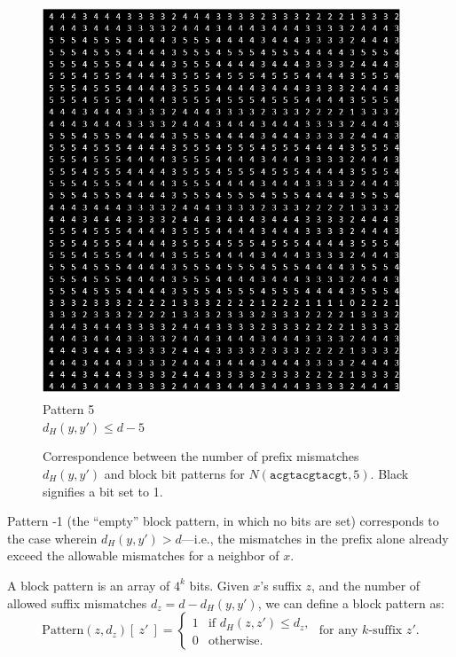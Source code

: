 \documentclass[oneside,12pt]{DISCSthesis}
\begin{document}
{\begin{figure}[h]
			\begin{minipage}{.33\textwidth}\centering\includegraphics[width=0.95\textwidth]{img/5}\\ Pattern 5 \\$d_H(y,y')\leq d-5$ \end{minipage}
			\newline\newline
			\caption[Block bit patterns vs prefix mismatches]{Correspondence between the number of prefix mismatches $d_H(y,y')$ and block bit patterns for $N(\texttt{acgtacgtacgt}, 5)$. Black signifies a bit set to 1.}
			\end{figure}

		\noindent Pattern -1 (the ``empty'' block pattern, in which no bits are set) corresponds to the case wherein $d_H(y,y') > d$---i.e., the mismatches in the prefix alone already exceed the allowable mismatches for a neighbor of $x$.

		\noindent A block pattern is an array of $4^k$ bits. Given $x$'s suffix $z$, and the number of allowed suffix mismatches $d_z = d - d_H(y,y')$, we can define a block pattern as:
		\begin{equation}
			\text{Pattern}(z,d_z) [\ z'\ ] = \left\{
			\begin{array}{rl}
				1 & \text{if } d_H(z,z') \leq d_z,\\
				0 & \text{otherwise.}
			\end{array} \right.
			\text{ for any $k$-suffix }z'.
			\end{equation}

}
\end{document}
